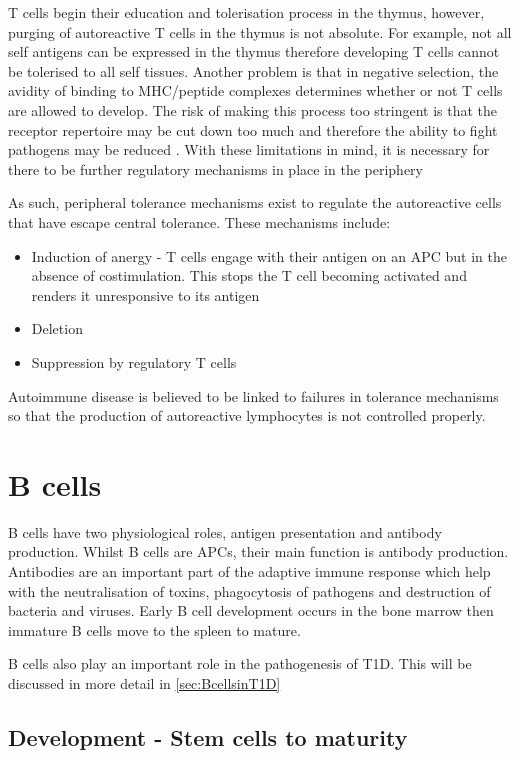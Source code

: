 T cells begin their education and tolerisation process in the thymus, however, purging of autoreactive T cells in the thymus is not absolute.
For example, not all self antigens can be expressed in the thymus therefore developing T cells cannot be tolerised to all self tissues.
Another problem is that in negative selection, the avidity of binding to MHC/peptide complexes determines whether or not T cells are allowed to develop.
The risk of making this process too stringent is that the receptor repertoire may be cut down too much and therefore the ability to fight pathogens may be reduced \citep{Walker2002}.
With these limitations in mind, it is necessary for there to be further regulatory mechanisms in place in the periphery

As such, peripheral tolerance mechanisms exist to regulate the autoreactive cells that have escape central tolerance.
These mechanisms include:
\begin{itemize}
\item Induction of anergy - T cells engage with their antigen on an APC but in the absence of costimulation. This stops the T cell becoming activated and renders it unresponsive to its antigen\citep{Abbas2004}
\item Deletion\citep{Abbas2004}
\item Suppression by regulatory T cells\citep{Abbas2004}
\end{itemize}

Autoimmune disease is believed to be linked to failures in tolerance mechanisms so that the production of autoreactive lymphocytes is not controlled properly.

\section{B cells}
\label{sec:Bcells}

B cells have two physiological roles, antigen presentation and antibody production.
Whilst B cells are APCs, their main function is antibody production.
Antibodies are an important part of the adaptive immune response which help with the neutralisation of toxins, phagocytosis of pathogens and destruction of bacteria and viruses.
Early B cell development occurs in the bone marrow then immature B cells move to the spleen to mature.

B cells also play an important role in the pathogenesis of T1D. 
This will be discussed in more detail in \cref{sec:BcellsinT1D}

\subsection{Development - Stem cells to maturity}
\label{subsec:Bcelldevelopment}
